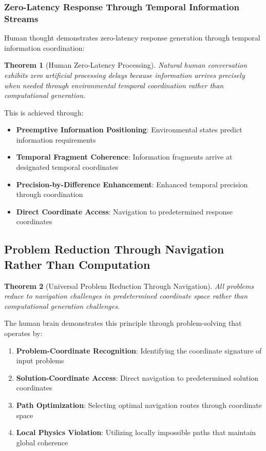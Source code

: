 \documentclass[12pt,a4paper]{article}
\newtheorem{theorem}{Theorem}
\begin{document}
\subsubsection{Zero-Latency Response Through Temporal Information Streams}

Human thought demonstrates zero-latency response generation through temporal information coordination:

\begin{theorem}[Human Zero-Latency Processing]
Natural human conversation exhibits zero artificial processing delays because information arrives precisely when needed through environmental temporal coordination rather than computational generation.
\end{theorem}

This is achieved through:
\begin{itemize}
\item \textbf{Preemptive Information Positioning}: Environmental states predict information requirements
\item \textbf{Temporal Fragment Coherence}: Information fragments arrive at designated temporal coordinates
\item \textbf{Precision-by-Difference Enhancement}: Enhanced temporal precision through coordination
\item \textbf{Direct Coordinate Access}: Navigation to predetermined response coordinates
\end{itemize}

\subsection{Problem Reduction Through Navigation Rather Than Computation}

\begin{theorem}[Universal Problem Reduction Through Navigation]
All problems reduce to navigation challenges in predetermined coordinate space rather than computational generation challenges.
\end{theorem}

The human brain demonstrates this principle through problem-solving that operates by:

\begin{enumerate}
\item \textbf{Problem-Coordinate Recognition}: Identifying the coordinate signature of input problems
\item \textbf{Solution-Coordinate Access}: Direct navigation to predetermined solution coordinates
\item \textbf{Path Optimization}: Selecting optimal navigation routes through coordinate space
\item \textbf{Local Physics Violation}: Utilizing locally impossible paths that maintain global coherence
\end{enumerate}
\end{document}
